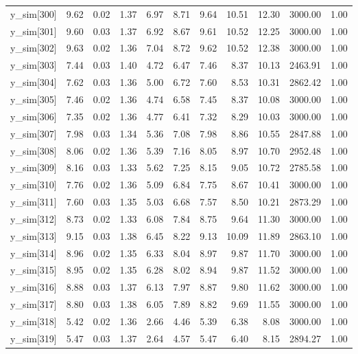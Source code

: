 \begin{table}[ht]
\begin{tabular}{rrrrrrrrrrr}
  y\_sim[300] & 9.62 & 0.02 & 1.37 & 6.97 & 8.71 & 9.64 & 10.51 & 12.30 & 3000.00 & 1.00 \\ 
  y\_sim[301] & 9.60 & 0.03 & 1.37 & 6.92 & 8.67 & 9.61 & 10.52 & 12.25 & 3000.00 & 1.00 \\ 
  y\_sim[302] & 9.63 & 0.02 & 1.36 & 7.04 & 8.72 & 9.62 & 10.52 & 12.38 & 3000.00 & 1.00 \\ 
  y\_sim[303] & 7.44 & 0.03 & 1.40 & 4.72 & 6.47 & 7.46 & 8.37 & 10.13 & 2463.91 & 1.00 \\ 
  y\_sim[304] & 7.62 & 0.03 & 1.36 & 5.00 & 6.72 & 7.60 & 8.53 & 10.31 & 2862.42 & 1.00 \\ 
  y\_sim[305] & 7.46 & 0.02 & 1.36 & 4.74 & 6.58 & 7.45 & 8.37 & 10.08 & 3000.00 & 1.00 \\ 
  y\_sim[306] & 7.35 & 0.02 & 1.36 & 4.77 & 6.41 & 7.32 & 8.29 & 10.03 & 3000.00 & 1.00 \\ 
  y\_sim[307] & 7.98 & 0.03 & 1.34 & 5.36 & 7.08 & 7.98 & 8.86 & 10.55 & 2847.88 & 1.00 \\ 
  y\_sim[308] & 8.06 & 0.02 & 1.36 & 5.39 & 7.16 & 8.05 & 8.97 & 10.70 & 2952.48 & 1.00 \\ 
  y\_sim[309] & 8.16 & 0.03 & 1.33 & 5.62 & 7.25 & 8.15 & 9.05 & 10.72 & 2785.58 & 1.00 \\ 
  y\_sim[310] & 7.76 & 0.02 & 1.36 & 5.09 & 6.84 & 7.75 & 8.67 & 10.41 & 3000.00 & 1.00 \\ 
  y\_sim[311] & 7.60 & 0.03 & 1.35 & 5.03 & 6.68 & 7.57 & 8.50 & 10.21 & 2873.29 & 1.00 \\ 
  y\_sim[312] & 8.73 & 0.02 & 1.33 & 6.08 & 7.84 & 8.75 & 9.64 & 11.30 & 3000.00 & 1.00 \\ 
  y\_sim[313] & 9.15 & 0.03 & 1.38 & 6.45 & 8.22 & 9.13 & 10.09 & 11.89 & 2863.10 & 1.00 \\ 
  y\_sim[314] & 8.96 & 0.02 & 1.35 & 6.33 & 8.04 & 8.97 & 9.87 & 11.70 & 3000.00 & 1.00 \\ 
  y\_sim[315] & 8.95 & 0.02 & 1.35 & 6.28 & 8.02 & 8.94 & 9.87 & 11.52 & 3000.00 & 1.00 \\ 
  y\_sim[316] & 8.88 & 0.03 & 1.37 & 6.13 & 7.97 & 8.87 & 9.80 & 11.62 & 3000.00 & 1.00 \\ 
  y\_sim[317] & 8.80 & 0.03 & 1.38 & 6.05 & 7.89 & 8.82 & 9.69 & 11.55 & 3000.00 & 1.00 \\ 
  y\_sim[318] & 5.42 & 0.02 & 1.36 & 2.66 & 4.46 & 5.39 & 6.38 & 8.08 & 3000.00 & 1.00 \\ 
  y\_sim[319] & 5.47 & 0.03 & 1.37 & 2.64 & 4.57 & 5.47 & 6.40 & 8.15 & 2894.27 & 1.00 \\ 

\end{tabular}
\end{table}
